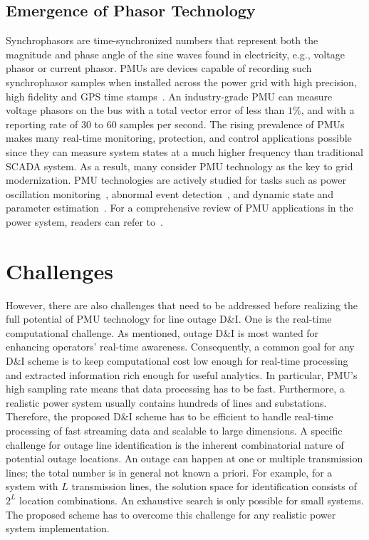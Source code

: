 \subsection{Emergence of Phasor Technology}
Synchrophasors are time-synchronized numbers that represent both the magnitude and phase angle of the sine waves found in electricity, e.g., voltage phasor or current phasor. PMUs are devices capable of recording such synchrophasor samples when installed across the power grid with high precision, high fidelity and GPS time stamps~\cite{Aminifar2014}. An industry-grade PMU can measure voltage phasors on the bus with a total vector error of less than $1\%$, and with a reporting rate of 30 to 60 samples per second. The rising prevalence of PMUs makes many real-time monitoring, protection, and control applications possible since they can measure system states at a much higher frequency than traditional SCADA system. As a result, many consider PMU technology as the key to grid modernization. PMU technologies are actively studied for tasks such as power oscillation monitoring~\cite{Abdi-Khorsand2017}, abnormal event detection~\cite{Mohamed2018,Kim2018}, and dynamic state and parameter estimation~\cite{Chakrabortty2009,Chavan2017}. For a comprehensive review of PMU applications in the power system, readers can refer to~\cite{Aminifar2014}. 


\section{Challenges}
However, there are also challenges that need to be addressed before realizing the full potential of PMU technology for line outage D\&I. 
One is the real-time computational challenge. As mentioned, outage D\&I is most wanted for enhancing operators' real-time awareness. Consequently, a common goal for any D\&I scheme is to keep computational cost low enough for real-time processing and extracted information rich enough for useful analytics. 
In particular, PMU's high sampling rate means that data processing has to be fast. Furthermore, a realistic power system usually contains hundreds of lines and substations. Therefore, the proposed D\&I scheme has to be efficient to handle real-time processing of fast streaming data and scalable to large dimensions. 
A specific challenge for outage line identification is the inherent combinatorial nature of potential outage locations. An outage can happen at one or multiple transmission lines; the total number is in general not known a priori. For example, for a system with $L$ transmission lines, the solution space for identification consists of $2^L$ location combinations. An exhaustive search is only possible for small systems. The proposed scheme has to overcome this challenge for any realistic power system implementation. 


